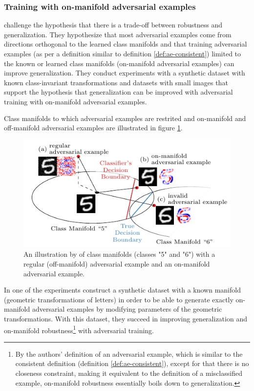 \documentclass{article}
\begin{document}
\subsubsection{Training with on-manifold adversarial examples}

\citet{Stutz:2018:DARG} challenge the hypothesis that there is a trade-off between robustness and generalization. They hypothesize that most adversarial examples come from directions orthogonal to the learned class manifolds and that training adversarial examples (as per a definition similar to definition \ref{def:ae-consistent}) limited to the known or learned class manifolds (on-manifold adversarial examples) can improve generalization. They conduct experiments with a synthetic dataset with known class-invariant transformations and datasets with small images that support the hypothesis that generalization can be improved with adversarial training with on-manifold adversarial examples.

Class manifolds to which adversarial examples are restrited and on-manifold and off-manifold adversarial examples are illustrated in figure \ref{fig:stutz-illustration}.

\begin{figure}
	\begin{center}
		\includegraphics[width=\columnwidth]{figures/adversarial-examples/stutz-introduction_b.pdf}
	\end{center}
	\caption{An illustration by \citet{Stutz:2018:DARG} of class manifolds (classes "5" and "6") with a regular (off-manifold) adversarial example and an on-manifold adversarial example.}
	\label{fig:stutz-illustration}
\end{figure}

In one of the experiments \citet{Stutz:2018:DARG} construct a synthetic dataset with a known manifold (geometric transformations of letters) in order to be able to generate exactly on-manifold adversarial examples by modifying parameters of the geometric transformations. With this dataset, they succeed in improving generalization and on-manifold robustness\footnote{By the authors' definition of an adversarial example, which is similar to the consistent definition (definition \ref{def:ae-consistent}), except for that there is no closeness constraint, making it equivalent to the definition of a misclassified example, on-manifold robustness essentially boils down to generalization.} with adversarial training.
\end{document}
